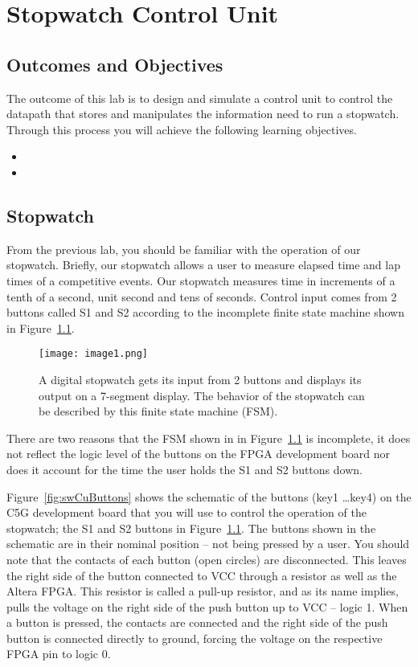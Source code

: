 \chapter{Stopwatch Control Unit}
\label{chapter:stopControl}
\graphicspath{ {./Lab10ControlUnit/Fig} }

\section{Outcomes and Objectives}

The outcome of this lab is to design and simulate 
a control unit to control the datapath that stores and 
manipulates the information need to run a stopwatch.
Through this process you will achieve the following
learning objectives.
\begin{itemize}
	\item {}
	\item {}
\end{itemize}


\section{Stopwatch}

From the previous lab, you should be familiar with the operation of our
stopwatch. Briefly, our stopwatch allows a user to measure elapsed time
and lap times of a competitive events. Our stopwatch measures time in
increments of a tenth of a second, unit second and tens of seconds.
Control input comes from 2 buttons called S1 and S2 according to the
incomplete finite state machine shown in Figure~\ref{fig:swCuHighLevel}.

\begin{figure}[ht]
\texttt{[image: image1.png]}
\caption{ A digital stopwatch gets its input from 2 buttons and displays
its output on a 7-segment display. The behavior of the stopwatch can be
described by this finite state machine (FSM).}
\label{fig:swCuHighLevel}
\end{figure}

There are two reasons that the FSM shown in in Figure~\ref{fig:swCuHighLevel} is incomplete,
it does not reflect the logic level of the buttons on the FPGA development board nor
does it account for the time the user holds the S1 and S2 buttons down.

Figure~\ref{fig:swCuButtons} shows the schematic of the buttons (key1 \ldots key4) on the
C5G development board that you will use to control the operation of the
stopwatch; the S1 and S2 buttons in Figure~\ref{fig:swCuHighLevel}. The buttons shown in the
schematic are in their nominal position -- not being pressed by a user.
You should note that the contacts of each button (open circles) are
disconnected. This leaves the right side of the button connected to VCC
through a resistor as well as the Altera FPGA. This resistor is called a
pull-up resistor, and as its name implies, pulls the voltage on the
right side of the push button up to VCC -- logic 1. When a button is
pressed, the contacts are connected and the right side of the push
button is connected directly to ground, forcing the voltage on the
respective FPGA pin to logic 0.

